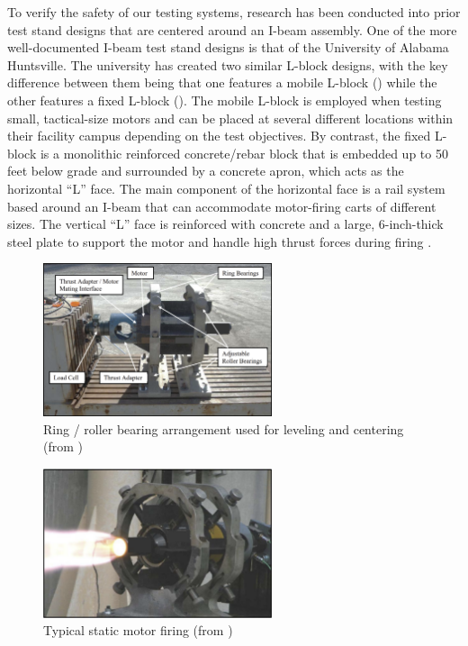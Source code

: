 To verify the safety of our testing systems, research has been conducted into prior test stand designs that are centered around an I-beam assembly. One of the more well-documented I-beam test stand designs is that of the University of Alabama Huntsville. The university has created two similar L-block designs, with the key difference between them being that one features a mobile L-block () while the other features a fixed L-block (). The mobile L-block is employed when testing small, tactical-size motors and can be placed at several different locations within their facility campus depending on the test objectives. By contrast, the fixed L-block is a monolithic reinforced concrete/rebar block that is embedded up to 50 feet below grade and surrounded by a concrete apron, which acts as the horizontal ``L'' face. The main component of the horizontal face is a rail system based around an I-beam that can accommodate motor-firing carts of different sizes.  The vertical ``L'' face is reinforced with concrete and a large, 6-inch-thick steel plate to support the motor and handle high thrust forces during firing \cite{uah-thesis}.

\begin{figure}
    \centering
    \includegraphics[width=0.6\textwidth]{images/ring-roller-bearing}
    \caption{Ring / roller bearing arrangement used for leveling and centering (from \cite{uah-thesis})}
    \label{figure:rollerbearing}
\end{figure}

\begin{figure}
    \centering
    \includegraphics[width=0.6\textwidth]{images/static-motor-firing}
    \caption{Typical static motor firing (from \cite{uah-thesis})}
    \label{figure:firing}
\end{figure}

